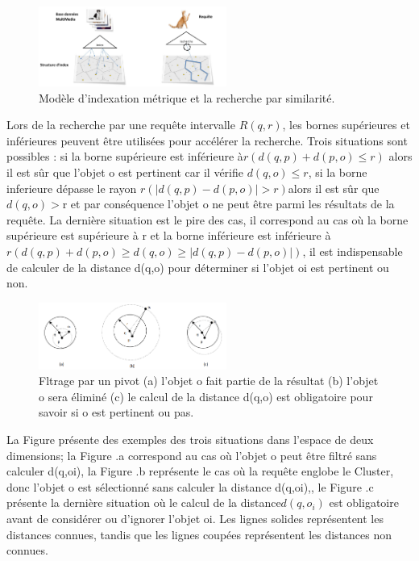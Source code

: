 \begin{figure}[H]
	\centering
	\includegraphics[width=0.55\textwidth]{Figures/similarity.png} %
	\caption{Modèle d'indexation métrique et la recherche par similarité.}
\end{figure}

Lors de la recherche par une requête intervalle $ R(q,r) $, les bornes supérieures et inférieures peuvent être utilisées pour accélérer la recherche. Trois situations sont possibles : si la borne supérieure est inférieure à$  r (d(q,p)+d(p,o) \leq r ) $ alors il est sûr que l’objet o est pertinent car il vérifie $ d(q,o) \leq r $, si la borne inferieure dépasse le rayon $ r ( |d(q,p)-d(p,o)| > r )  $alors il est sûr que $ d(q,o) >  $r et par conséquence l’objet o ne peut être parmi les résultats de la requête. La dernière situation est le pire des cas, il correspond au cas où la borne supérieure est supérieure à r et la borne inférieure est inférieure à$  r (d(q,p)+d(p,o) \geq d(q,o)\geq |d(q,p)-d(p,o)|) $, il est indispensable de calculer de la distance d(q,o) pour déterminer si l’objet oi est pertinent ou non.

\begin{figure}[H]
	\centering
	\includegraphics[width=0.55\textwidth]{Figures/pivot.png} %
	\caption{Fltrage par un pivot (a) l'objet o fait partie de la résultat (b) l'objet o sera éliminé (c) le calcul de la
		distance d(q,o) est obligatoire pour savoir si o est pertinent ou pas.}
\end{figure}

La Figure présente des exemples des trois situations dans l’espace de deux dimensions; la Figure .a correspond au cas où l’objet o peut être filtré sans calculer d(q,oi), la Figure .b représente le cas où la requête englobe le Cluster, donc l’objet o est sélectionné sans calculer la distance d(q,oi),, le Figure .c présente la dernière situation où le calcul de la distance$  d(q,o_i) $ est obligatoire avant de considérer ou d’ignorer l’objet oi. Les lignes solides représentent les distances connues, tandis que les lignes coupées représentent les distances non connues.

